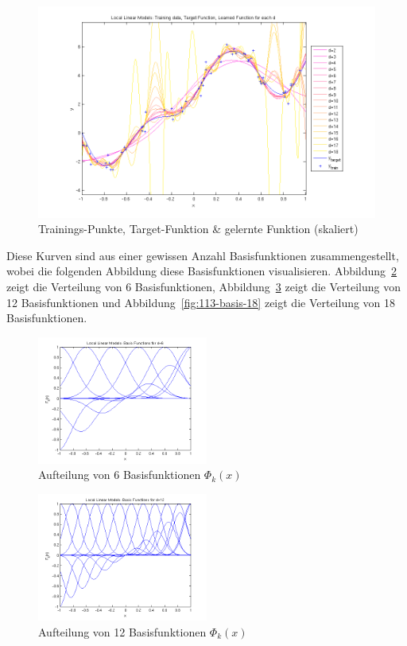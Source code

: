 \begin{figure}[h!]
  \centering
  \includegraphics[width=\textwidth]{./figures/1_1_3_curves_in.png}
  \caption{Trainings-Punkte, Target-Funktion \& gelernte Funktion (skaliert)}
  \label{fig:113-curves-in}
\end{figure}

Diese Kurven sind aus einer gewissen Anzahl Basisfunktionen zusammengestellt, wobei die folgenden Abbildung diese Basisfunktionen visualisieren. Abbildung~\ref{fig:113-basis-6} zeigt die Verteilung von 6 Basisfunktionen, Abbildung~\ref{fig:113-basis-12} zeigt die Verteilung von 12 Basisfunktionen und Abbildung~\ref{fig:113-basis-18} zeigt die Verteilung von 18 Basisfunktionen.

\begin{figure}[h!]
  \centering
  \includegraphics[width=0.5\textwidth]{./figures/1_1_3_basis_6.png}
  \caption{Aufteilung von 6 Basisfunktionen $\Phi_k(x)$}
  \label{fig:113-basis-6}
\end{figure}

\begin{figure}[h!]
  \centering
  \includegraphics[width=0.5\textwidth]{./figures/1_1_3_basis_12.png}
  \caption{Aufteilung von 12 Basisfunktionen $\Phi_k(x)$}
  \label{fig:113-basis-12}
\end{figure}

